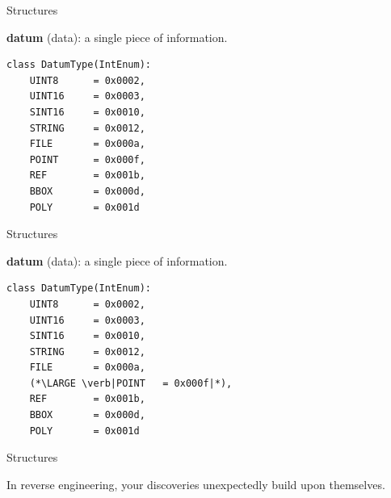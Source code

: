 \documentclass[xcolor={dvipsnames,table},aspectratio=169]{beamer}
\begin{document}

\begin{frame}[fragile]{Structures}\pause
  \begin{center}
    \Large \textbf{datum}\pause{} (data):\pause{} a single piece of information.\pause
  \end{center}
\begin{lstlisting}
class DatumType(IntEnum):
    UINT8      = 0x0002,
    UINT16     = 0x0003,
    SINT16     = 0x0010,
    STRING     = 0x0012,
    FILE       = 0x000a,
    POINT      = 0x000f,
    REF        = 0x001b,
    BBOX       = 0x000d,
    POLY       = 0x001d
\end{lstlisting}
\end{frame}

\begin{frame}[fragile]{Structures}
  \begin{center}
    \Large \textbf{datum} (data): a single piece of information.
  \end{center}
\begin{lstlisting}
class DatumType(IntEnum):
    UINT8      = 0x0002,
    UINT16     = 0x0003,
    SINT16     = 0x0010,
    STRING     = 0x0012,
    FILE       = 0x000a,
    (*\LARGE \verb|POINT   = 0x000f|*),
    REF        = 0x001b,
    BBOX       = 0x000d,
    POLY       = 0x001d
\end{lstlisting}
\end{frame}

\begin{frame}[label=proverb]{Structures}
  \begin{center}
    \LARGE In reverse engineering, your discoveries unexpectedly build upon themselves.
  \end{center}
\end{frame}
\end{document}
